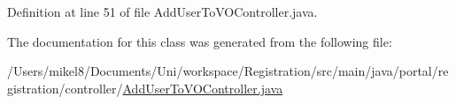 Definition at line 51 of file AddUserToVOController.java.



The documentation for this class was generated from the following file:\begin{DoxyCompactItemize}
\item 
/Users/mikel8/Documents/Uni/workspace/Registration/src/main/java/portal/registration/controller/\hyperlink{AddUserToVOController_8java}{AddUserToVOController.java}\end{DoxyCompactItemize}
